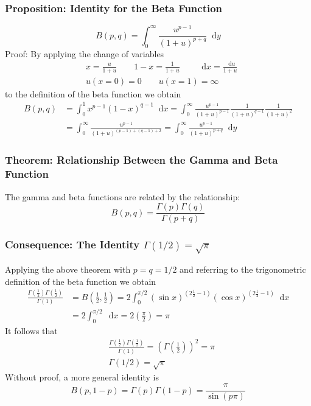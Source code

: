 \documentclass[11pt, a4paper]{article}
\newcommand{\diff}{\mathop{}\!\mathrm{d}} %
\begin{document}
\subsubsection{Proposition: Identity for the Beta Function}
\begin{equation*}
	B(p, q) = \int_{0}^{\infty}\frac{u^{p-1}}{(1+u)^{p+q}}\diff y
\end{equation*}
Proof: By applying the change of variables 
\begin{align*}
	&x = \frac{u}{1+u} \qquad 1-x = \frac{1}{1+u} \qquad \diff x = \frac{\diff u}{1+u}\\
	&u(x=0) = 0 \qquad u(x=1) = \infty
\end{align*}
to the definition of the beta function we obtain
\begin{align*}
B(p, q) &= \int_{0}^{1}x^{p-1}(1-x)^{q-1}\diff x = \int_{0}^{\infty}\frac{u^{p-1}}{(1+u)^{p-1}}\frac{1}{(1+u)^{q-1}}\frac{1}{(1+u)^{2}}\\[1.5ex]
&=\int_{0}^{\infty}\frac{u^{p-1}}{(1+u)^{(p-1) + (q-1) + 2}} = \int_{0}^{\infty}\frac{u^{p-1}}{(1+u)^{p+q}}\diff y
\end{align*}

\subsubsection{Theorem: Relationship Between the Gamma and Beta Function}
The gamma and beta functions are related by the relationship:
\begin{equation*}
	B(p, q) = \frac{\Gamma(p)\Gamma(q)}{\Gamma(p+q)}
\end{equation*}

\subsubsection{Consequence: The Identity $ \Gamma(1/2) = \sqrt{\pi} $}
Applying the above theorem with $ p = q = 1/2 $ and referring to the trigonometric definition of the beta function we obtain
\begin{align*}
	\frac{\Gamma(\frac{1}{2})\Gamma(\frac{1}{2})}{\Gamma(1)} &= B\left(\frac{1}{2}, \frac{1}{2}\right) = 2\int_{0}^{\pi / 2}(\sin x)^{(2 \frac{1}{2} - 1)}(\cos x)^{(2 \frac{1}{2} - 1)} \diff x \\[1.5ex]
	& = 2 \int_{0}^{\pi / 2}\diff x = 2 \left(\frac{\pi}{2} \right)= \pi
\end{align*}
It follows that
\begin{align*}
	&\frac{\Gamma(\frac{1}{2})\Gamma(\frac{1}{2})}{\Gamma(1)} = \left(\Gamma\left(\frac{1}{2}\right)\right)^2= \pi\\[1.5ex]
	&\Gamma(1/2) = \sqrt{\pi}
\end{align*}
Without proof, a more general identity is
\begin{equation*}
	B(p, 1-p) = \Gamma(p)\Gamma(1-p) = \frac{\pi}{\sin(p\pi)}
\end{equation*}
\end{document}
